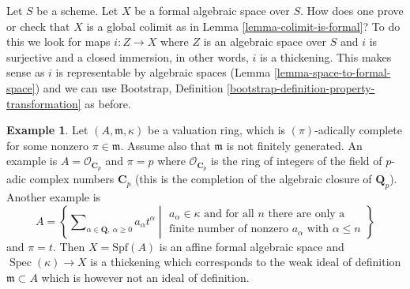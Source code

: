 \documentclass{stacks-project}
\theoremstyle{plain}
\theoremstyle{definition}
\newtheorem{example}[subsection]{Example}
\theoremstyle{remark}
\numberwithin{equation}{subsection}
\def\Spec{\mathop{\mathrm{Spec}}}
\begin{document}
\noindent
Let $S$ be a scheme. Let $X$ be a formal algebraic space over $S$.
How does one prove or check that $X$ is a global colimit as in
Lemma \ref{lemma-colimit-is-formal}? To do this we look for maps
$i : Z \to X$ where $Z$ is an algebraic space over $S$ and $i$ is
surjective and a closed immersion, in other words, $i$ is a thickening.
This makes sense as $i$ is representable by algebraic spaces
(Lemma \ref{lemma-space-to-formal-space}) and we can use
Bootstrap, Definition \ref{bootstrap-definition-property-transformation}
as before.

\begin{example}
\label{example-david-hansen}
Let $(A, \mathfrak m, \kappa)$ be a valuation ring, which is
$(\pi)$-adically complete for some nonzero $\pi \in \mathfrak m$.
Assume also that $\mathfrak m$ is not finitely generated.
An example is $A = \mathcal{O}_{\mathbf{C}_p}$ and $\pi = p$
where $\mathcal{O}_{\mathbf{C}_p}$ is the ring of integers
of the field of $p$-adic complex numbers $\mathbf{C}_p$
(this is the completion of the algebraic closure of
$\mathbf{Q}_p$). Another example is
$$
A =
\left\{
\sum\nolimits_{\alpha \in \mathbf{Q},\ \alpha \geq 0} a_\alpha t^\alpha
\middle|
\begin{matrix}
a_\alpha \in \kappa \text{ and for all }n\text{ there are only a} \\
\text{finite number of nonzero }a_\alpha
\text{ with }\alpha \leq n
\end{matrix}
\right\}
$$
and $\pi = t$. Then $X = \text{Spf}(A)$ is an affine formal algebraic
space and $\Spec(\kappa) \to X$ is a thickening which corresponds
to the weak ideal of definition $\mathfrak m \subset A$
which is however not an ideal of definition.
\end{example}
\end{document}
